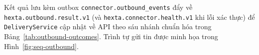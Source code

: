 Kết quả lưu kèm outbox \texttt{connector.\hspace{0pt}outbound\_\hspace{0pt}events} đẩy về \texttt{hexta.\hspace{0pt}outbound.\hspace{0pt}result.\hspace{0pt}v1} (và \texttt{hexta.\hspace{0pt}connector.\hspace{0pt}health.\hspace{0pt}v1} khi lỗi xác thực) để \texttt{Delivery\hspace{0pt}Service} cập nhật về API theo sáu nhánh chuẩn hóa trong Bảng~\ref{tab:outbound-outcomes}. Trình tự gửi tin được minh họa trong Hình~\ref{fig:seq-outbound}.




